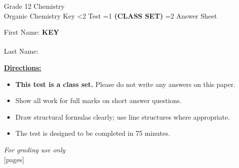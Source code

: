 \documentclass[addpoints]{exam}
\newcommand{\event}{Organic Chemistry}
\newcommand{\tournament}{}  %
\def\type{0}
\begin{document}
\begin{center}
    {\huge Grade 12 Chemistry \\ \event
    \ifprintanswers
     \space Key
    \else
     \space \ifnum\type<2 Test \fi \ifnum\type=1 \textbf{(CLASS SET)} \fi \ifnum\type=2 Answer Sheet \fi
    \fi \\ \vspace{3mm}\tournament\vspace{1mm}}
\end{center}

\vspace{.25\textheight}

\begin{center}
    First Name: \ifprintanswers
    \underline{\hspace{3.5cm}}\textbf{KEY}\underline{\hspace{5.5cm}}\\\vspace{5mm}
    \else
        \underline{\hspace{10cm}}\\ \vspace{5mm}
    \fi
    Last Name: \underline{\hspace{10cm}}\\ \vspace{5mm}
\end{center}

\noindent\textbf{\underline{Directions:}}
\begin{itemize}
    \ifnum\type=1 \item \textbf{This test is a class set.} Please do not write any answers on this paper. \fi
    \item Show all work for full marks on short answer questions.
    \item Draw structural formulas clearly; use line structures where appropriate.
    \item The test is designed to be completed in 75 minutes.
\end{itemize}
\begin{center}
\textit{For grading use only}\\
[pages]
\end{center}
\end{document}
